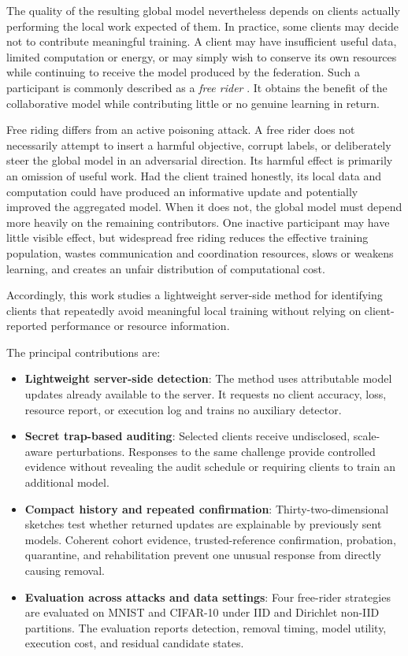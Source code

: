 \documentclass[conference]{IEEEtran}
\begin{document}
The quality of the resulting global model nevertheless depends on clients actually performing the local work expected of them. In practice, some clients may decide not to contribute meaningful training. A client may have insufficient useful data, limited computation or energy, or may simply wish to conserve its own resources while continuing to receive the model produced by the federation. Such a participant is commonly described as a \emph{free rider} \cite{lin2019freeriders,fraboni2021freerider}. It obtains the benefit of the collaborative model while contributing little or no genuine learning in return.

Free riding differs from an active poisoning attack. A free rider does not necessarily attempt to insert a harmful objective, corrupt labels, or deliberately steer the global model in an adversarial direction. Its harmful effect is primarily an omission of useful work. Had the client trained honestly, its local data and computation could have produced an informative update and potentially improved the aggregated model. When it does not, the global model must depend more heavily on the remaining contributors. One inactive participant may have little visible effect, but widespread free riding reduces the effective training population, wastes communication and coordination resources, slows or weakens learning, and creates an unfair distribution of computational cost.

Accordingly, this work studies a lightweight server-side method for identifying clients that repeatedly avoid meaningful local training without relying on client-reported performance or resource information.


The principal contributions are:
\begin{itemize}[leftmargin=*,nosep]
\item \textbf{Lightweight server-side detection}: The method uses attributable model updates already available to the server. It requests no client accuracy, loss, resource report, or execution log and trains no auxiliary detector.
\item \textbf{Secret trap-based auditing}: Selected clients receive undisclosed, scale-aware perturbations. Responses to the same challenge provide controlled evidence without revealing the audit schedule or requiring clients to train an additional model.
\item \textbf{Compact history and repeated confirmation}: Thirty-two-dimensional sketches test whether returned updates are explainable by previously sent models. Coherent cohort evidence, trusted-reference confirmation, probation, quarantine, and rehabilitation prevent one unusual response from directly causing removal.
\item \textbf{Evaluation across attacks and data settings}: Four free-rider strategies are evaluated on MNIST and CIFAR-10 under IID and Dirichlet non-IID partitions. The evaluation reports detection, removal timing, model utility, execution cost, and residual candidate states.
\end{itemize}
\end{document}
